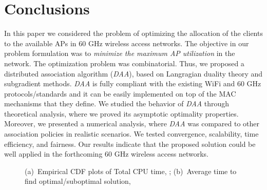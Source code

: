 \documentclass[journal, 10pt, twocolumn]{IEEEtran}
\begin{document}
\section{Conclusions}\label{sec:conclusions}
In this paper we considered the problem of optimizing the allocation of the clients to the available APs in 60 GHz wireless access networks. The objective in our problem formulation was to \emph{minimize the maximum AP utilization} in the network. The optimization problem was combinatorial. Thus, we proposed a distributed association algorithm (\emph{DAA}), based on Langragian duality theory and subgradient methods. \emph{DAA} is fully compliant with the existing WiFi and 60 GHz protocols/standards and it can be easily implemented on top of the MAC mechanisms that they define. We studied the behavior of \emph{DAA} through theoretical analysis, where we proved its asymptotic optimality properties. Moreover, we presented a numerical analysis, where \emph{DAA} was compared to other association policies in realistic scenarios. We tested convergence, scalability, time efficiency, and fairness. Our results indicate that the proposed solution could be well applied in the forthcoming 60 GHz wireless access networks. 



\begin{figure}[t]
\centering
{}
\goodgap
{}\vspace{-2mm}
\caption{(a)~Empirical CDF plots of Total CPU time, ; (b)~Average time to find optimal/suboptimal solution, }
\label{fig:Bound_illustration_all8}
\vspace{-0.4cm}
\end{figure}
\end{document}
